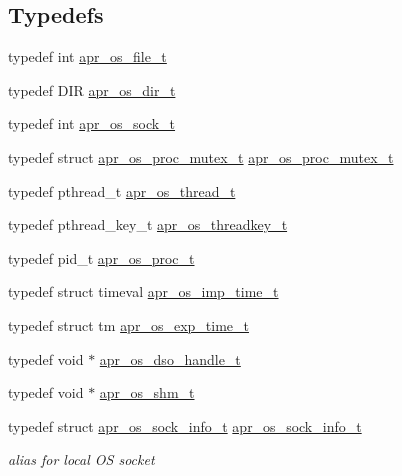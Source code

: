 \subsection*{Typedefs}
\begin{DoxyCompactItemize}
\item 
typedef int \hyperlink{group__apr__portabile_ga885491b889a4a719549650d3a370fd34}{apr\+\_\+os\+\_\+file\+\_\+t}
\item 
typedef D\+IR \hyperlink{group__apr__portabile_gacb790646cfc3da1b43a5f7c4bfaa3937}{apr\+\_\+os\+\_\+dir\+\_\+t}
\item 
typedef int \hyperlink{group__apr__portabile_ga2965cd2e48cb6513bc0ba05aa6083ed7}{apr\+\_\+os\+\_\+sock\+\_\+t}
\item 
typedef struct \hyperlink{structapr__os__proc__mutex__t}{apr\+\_\+os\+\_\+proc\+\_\+mutex\+\_\+t} \hyperlink{group__apr__portabile_ga107413a26e947456cabfcab99b8a7ade}{apr\+\_\+os\+\_\+proc\+\_\+mutex\+\_\+t}
\item 
typedef pthread\+\_\+t \hyperlink{group__apr__portabile_ga4ccd9519af148ccf9cff850dd58f00b6}{apr\+\_\+os\+\_\+thread\+\_\+t}
\item 
typedef pthread\+\_\+key\+\_\+t \hyperlink{group__apr__portabile_ga0a228496d8a1a9b3be744ddb101a3e76}{apr\+\_\+os\+\_\+threadkey\+\_\+t}
\item 
typedef pid\+\_\+t \hyperlink{group__apr__portabile_ga2ce5962de629ee6528081813c6b60e2e}{apr\+\_\+os\+\_\+proc\+\_\+t}
\item 
typedef struct timeval \hyperlink{group__apr__portabile_ga6d27e476300cd1d3fda24e1ff0e358e1}{apr\+\_\+os\+\_\+imp\+\_\+time\+\_\+t}
\item 
typedef struct tm \hyperlink{group__apr__portabile_ga0fa9349212690591b09a0cbea7b61bdd}{apr\+\_\+os\+\_\+exp\+\_\+time\+\_\+t}
\item 
typedef void $\ast$ \hyperlink{group__apr__portabile_ga542684803ee8ab0abd69077697599ec0}{apr\+\_\+os\+\_\+dso\+\_\+handle\+\_\+t}
\item 
typedef void $\ast$ \hyperlink{group__apr__portabile_ga7af1085d6390fbd08d66482b8c17de51}{apr\+\_\+os\+\_\+shm\+\_\+t}
\item 
typedef struct \hyperlink{structapr__os__sock__info__t}{apr\+\_\+os\+\_\+sock\+\_\+info\+\_\+t} \hyperlink{group__apr__portabile_gaece2b8b41cbb949590896b47daaa9fd2}{apr\+\_\+os\+\_\+sock\+\_\+info\+\_\+t}\hypertarget{group__apr__portabile_gaece2b8b41cbb949590896b47daaa9fd2}{}\label{group__apr__portabile_gaece2b8b41cbb949590896b47daaa9fd2}

\begin{DoxyCompactList}\small\item\em alias for local OS socket \end{DoxyCompactList}\end{DoxyCompactItemize}
